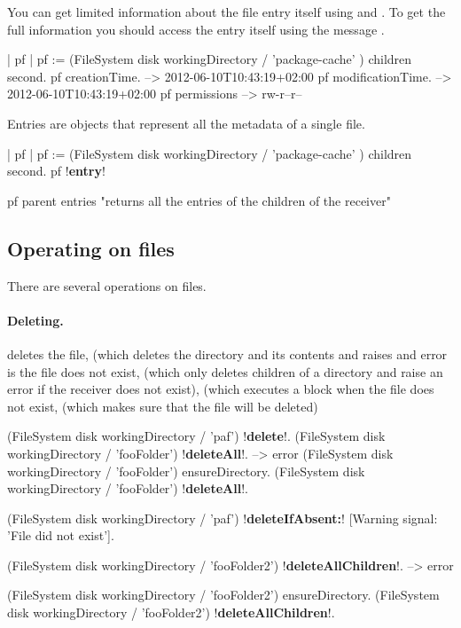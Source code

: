 \documentclass[a4paper,10pt,twoside]{book}
\begin{document}
You can get limited information about the file entry itself using  and . 
To get the full information you should access the entry itself using the message . 

\begin{code}{}
| pf |
pf := (FileSystem disk workingDirectory / 'package-cache' ) children second.
pf creationTime.
	--> 2012-06-10T10:43:19+02:00
pf modificationTime.
	--> 2012-06-10T10:43:19+02:00
pf permissions
	--> rw-r--r--
\end{code}

Entries are objects that represent all the metadata of a single file. 
\begin{code}{}
| pf |
pf := (FileSystem disk workingDirectory / 'package-cache' ) children second.
pf !\textbf{entry}!

pf parent entries
	"returns all the entries of the children of the receiver"
\end{code}


\subsection{Operating on files}
There are several operations on files.


\paragraph{Deleting.}
 deletes the file,  (which deletes the directory and its contents and raises and error is the file does not exist,
 (which only deletes children of a directory and raise an error if the receiver does not exist),  (which executes a block when the file does not exist,  (which makes sure that the file will be deleted)




\begin{code}{}
(FileSystem disk workingDirectory / 'paf') !\textbf{delete}!.
(FileSystem disk workingDirectory / 'fooFolder') !\textbf{deleteAll}!.
  --> error
(FileSystem disk workingDirectory / 'fooFolder') ensureDirectory.
(FileSystem disk workingDirectory / 'fooFolder') !\textbf{deleteAll}!.

(FileSystem disk workingDirectory / 'paf') !\textbf{deleteIfAbsent:}! [Warning signal: 'File did not exist'].

(FileSystem disk workingDirectory / 'fooFolder2') !\textbf{deleteAllChildren}!.
  --> error

(FileSystem disk workingDirectory / 'fooFolder2') ensureDirectory.
(FileSystem disk workingDirectory / 'fooFolder2') !\textbf{deleteAllChildren}!.
\end{code}
\end{document}
